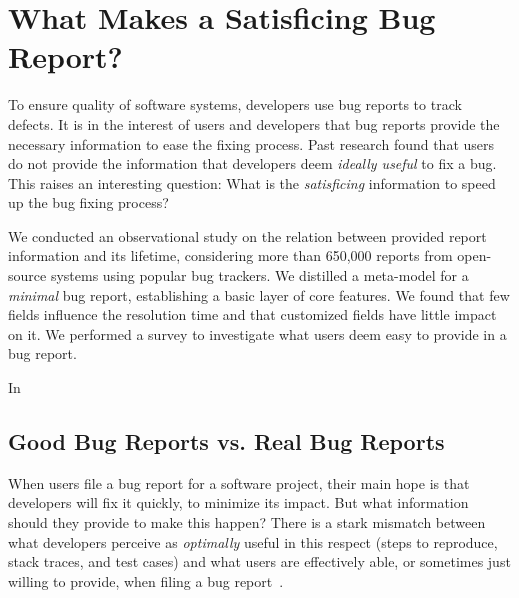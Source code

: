 

%

%

\newcommand{\RQ}[2]{%
\refstepcounter{RQCounter} \label{#1}
 \begin{center}
  \begin{examplebox}
   \textbf{RQ\arabic{RQCounter}.}~#2
  \end{examplebox}
 \end{center}
}


\chapter{What Makes a Satisficing Bug Report?}\label{ch:model}

To ensure quality of software systems, developers use bug reports to track defects.
It is in the interest of users and developers that bug reports provide the necessary information to ease the fixing process.
Past research found that users do not provide the information that developers deem \emph{ideally useful} to fix a bug.
This raises an interesting question: What is the \emph{satisficing} information to speed up the bug fixing process?

We conducted an observational study on the relation between provided report information and its lifetime, considering more than 650,000 reports from open-source systems using popular bug trackers.
We distilled a meta-model for a \emph{minimal} bug report, establishing a basic layer of core features.
We found that few fields influence the resolution time and that customized fields have little impact on it.
We performed a survey to investigate what users deem easy to provide in a bug report.

\structure
In
\newpage


\section{Good Bug Reports vs. Real Bug Reports}

When users file a bug report for a software project, their main hope is that developers will fix it quickly, to minimize its impact.
But what information should they provide to make this happen? There is a stark mismatch between what developers perceive as \emph{optimally} useful in this respect (\ie steps to reproduce, stack traces, and test cases) and what users are effectively able, or sometimes just willing to provide, when filing a bug report~\cite{Zimm2010a}.

